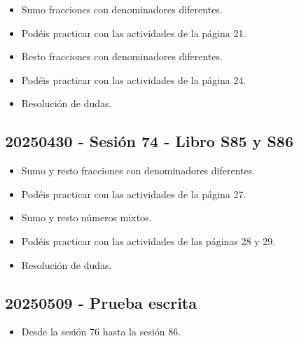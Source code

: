 \documentclass[a4paper,12pt]{article}
\begin{document}
\begin{itemize}
    \item Sumo fracciones con denominadores diferentes.
    \item Podéis practicar con las actividades de la página 21.
    \item Resto fracciones con denominadores diferentes.
    \item Podéis practicar con las actividades de la página 24.
    \item Resolución de dudas.
\end{itemize}

\subsection{20250430 - Sesión 74 - Libro S85 y S86}

\begin{itemize}
    \item Sumo y resto fracciones con denominadores diferentes.
    \item Podéis practicar con las actividades de la página 27.
    \item Sumo y resto números mixtos.
    \item Podéis practicar con las actividades de las páginas 28 y 29.
    \item Resolución de dudas. 
\end{itemize}

\subsection{20250509 - Prueba escrita}

\begin{itemize}
    \item Desde la sesión 76 hasta la sesión 86.
\end{itemize}
\end{document}

